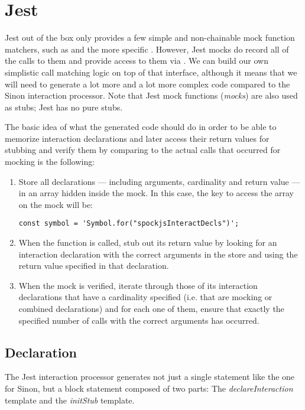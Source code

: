 \section{Jest}
Jest out of the box only provides a few
simple and non-chainable mock function matchers,
such as 
and the more specific .
However, Jest mocks do record
all of the calls to them
and provide access to them via
.
We can build our own simplistic call matching logic
on top of that interface,
although it means that we will need to
generate a lot more and a lot more complex code
compared to the Sinon interaction processor.
Note that Jest mock functions (\textit{mocks})
are also used as stubs;
Jest has no pure stubs.

The basic idea of what the generated code should do
in order to be able to memorize interaction declarations
and later access their return values for stubbing
and verify them by comparing to the actual calls that occurred for mocking
is the following:
\begin{enumerate}
  \item Store all declarations
    --- including arguments, cardinality and return value ---
    in an array hidden inside the mock.
    In this case, the key to access the array on the mock will be:
    \begin{verbatim}
const symbol = 'Symbol.for("spockjsInteractDecls")';
    \end{verbatim}
  \item When the function is called,
    stub out its return value by
    looking for an interaction declaration
    with the correct arguments in the store
    and using the return value specified in that declaration.
  \item When the mock is verified,
    iterate through those of its interaction declarations
    that have a cardinality specified
    (i.e. that are mocking or combined declarations)
    and for each one of them,
    ensure that exactly the specified number of calls
    with the correct arguments has occurred.
\end{enumerate}

\subsection{Declaration}
The Jest interaction processor generates
not just a single statement like the one for Sinon,
but a block statement composed of two parts:
The \textit{declareInteraction} template and
the \textit{initStub} template.

